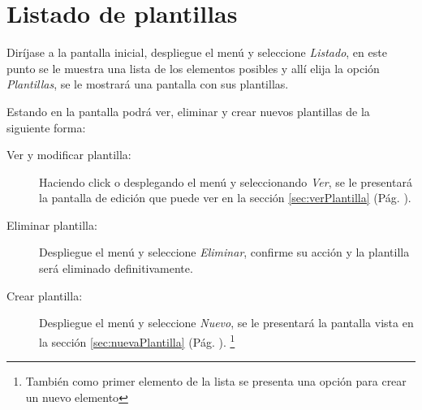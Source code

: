 \section{Listado de plantillas}
\label{sec:listadoPlantillas}
Dir\'ijase a la pantalla inicial, despliegue el men\'u \blackberry y seleccione
\emph{Listado}, en este punto se le muestra una lista de los elementos posibles
y all\'i elija la opci\'on \emph{Plantillas}, se le mostrar\'a una
pantalla con sus plantillas.

Estando en la pantalla podr\'a ver, eliminar y crear nuevos plantillas de la
siguiente forma:

\begin{description}
\item[Ver y modificar plantilla:]Haciendo click o desplegando el men\'u
\blackberry y seleccionando \emph{Ver}, se le presentar\'a la pantalla de
edici\'on que puede ver en la secci\'on \ref{sec:verPlantilla} (P\'ag.
\pageref{sec:verPlantilla}).
\item[Eliminar plantilla:]Despliegue el men\'u \blackberry y seleccione
\emph{Eliminar}, confirme su acci\'on y la plantilla ser\'a eliminado
definitivamente.
\item[Crear plantilla:]Despliegue el men\'u \blackberry y seleccione
\emph{Nuevo}, se le presentar\'a la pantalla vista en la
secci\'on \ref{sec:nuevaPlantilla} (P\'ag. \pageref{sec:nuevaPlantilla}).
\footnote{Tambi\'en como primer elemento de la lista se presenta una opci\'on
para crear un nuevo elemento}
\end{description}